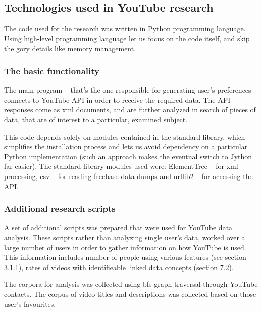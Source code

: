 \subsection{Technologies used in YouTube research}
The code used for the research was written in Python programming language. Using
high-level programming language let us focus on the code itself, and skip the
gory details like memory management.

\subsubsection{The basic functionality}
The main program -- that's the one responsible for generating user's preferences
-- connects to YouTube API in order to receive the required data. The
API responses come as xml documents, and are further analyzed in search of
pieces of data, that are of interest to a particular, examined subject.

This code depends solely on modules contained in the standard library, which
simplifies the installation process and lets us avoid dependency on a particular
Python implementation (such an approach makes the eventual switch to Jython far
easier). The standard library modules used were: ElementTree -- for xml
processing, csv -- for reading freebase data dumps and urllib2 -- for accessing
the API.

\subsubsection{Additional research scripts}

A set of additional scripts was prepared that were used for YouTube data
analysis. These scripts rather than analyzing single user's data, worked over a
large number of users in order to gather information on how YouTube is used.
This information includes number of people using various features (see section
3.1.1), rates of videos with identifieable linked data concepts (section 7.2).

The corpora for analysis was collected using bfs graph traversal through YouTube
contacts. The corpus of video titles and descriptions was collected based on
those user's favourites.